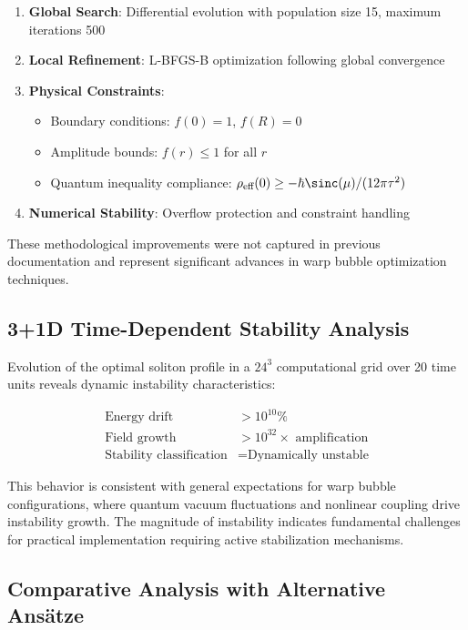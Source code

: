 \documentclass[12pt,a4paper]{article}
\begin{document}
\begin{enumerate}
\item \textbf{Global Search}: Differential evolution with population size 15, maximum iterations 500
\item \textbf{Local Refinement}: L-BFGS-B optimization following global convergence
\item \textbf{Physical Constraints}:
   \begin{itemize}
   \item Boundary conditions: $f(0) = 1$, $f(R) = 0$
   \item Amplitude bounds: $f(r) \leq 1$ for all $r$
   \item Quantum inequality compliance: $\rho_{\text{eff}}(0) \geq -\hbar\sinc(\mu)/(12\pi\tau^2)$
   \end{itemize}
\item \textbf{Numerical Stability}: Overflow protection and constraint handling
\end{enumerate}

These methodological improvements were not captured in previous documentation and represent significant advances in warp bubble optimization techniques.

\subsection{3+1D Time-Dependent Stability Analysis}

Evolution of the optimal soliton profile in a $24^3$ computational grid over 20 time units reveals dynamic instability characteristics:

\begin{align}
\text{Energy drift} &> 10^{10}\% \\
\text{Field growth} &> 10^{32} \times \text{ amplification} \\
\text{Stability classification} &= \text{Dynamically unstable}
\end{align}

This behavior is consistent with general expectations for warp bubble configurations, where quantum vacuum fluctuations and nonlinear coupling drive instability growth. The magnitude of instability indicates fundamental challenges for practical implementation requiring active stabilization mechanisms.

\subsection{Comparative Analysis with Alternative Ansätze}
\end{document}
